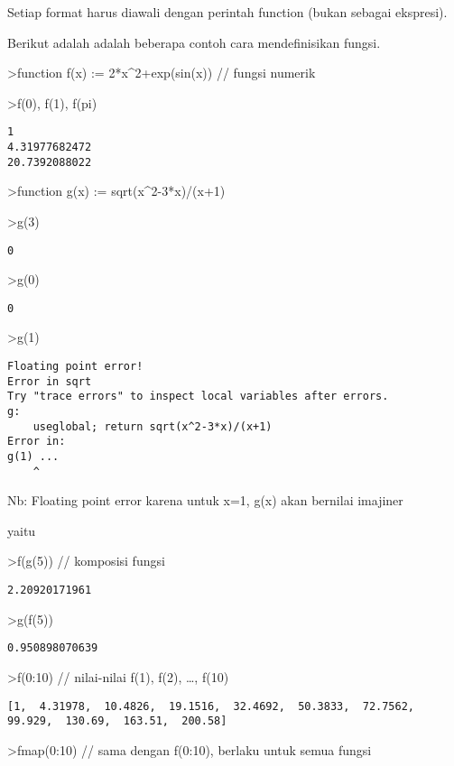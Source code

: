 \documentclass[
]{book}
\begin{document}
Setiap format harus diawali dengan perintah function (bukan sebagai ekspresi).

Berikut adalah adalah beberapa contoh cara mendefinisikan fungsi.

\textgreater function f(x) := 2*x\^{}2+exp(sin(x)) // fungsi numerik

\textgreater f(0), f(1), f(pi)

\begin{verbatim}
1
4.31977682472
20.7392088022
\end{verbatim}

\textgreater function g(x) := sqrt(x\^{}2-3*x)/(x+1)

\textgreater g(3)

\begin{verbatim}
0
\end{verbatim}

\textgreater g(0)

\begin{verbatim}
0
\end{verbatim}

\textgreater g(1)

\begin{verbatim}
Floating point error!
Error in sqrt
Try "trace errors" to inspect local variables after errors.
g:
    useglobal; return sqrt(x^2-3*x)/(x+1) 
Error in:
g(1) ...
    ^
\end{verbatim}

Nb: Floating point error karena untuk x=1, g(x) akan bernilai imajiner

yaitu

\textgreater f(g(5)) // komposisi fungsi

\begin{verbatim}
2.20920171961
\end{verbatim}

\textgreater g(f(5))

\begin{verbatim}
0.950898070639
\end{verbatim}

\textgreater f(0:10) // nilai-nilai f(1), f(2), \ldots, f(10)

\begin{verbatim}
[1,  4.31978,  10.4826,  19.1516,  32.4692,  50.3833,  72.7562,
99.929,  130.69,  163.51,  200.58]
\end{verbatim}

\textgreater fmap(0:10) // sama dengan f(0:10), berlaku untuk semua fungsi
\end{document}
